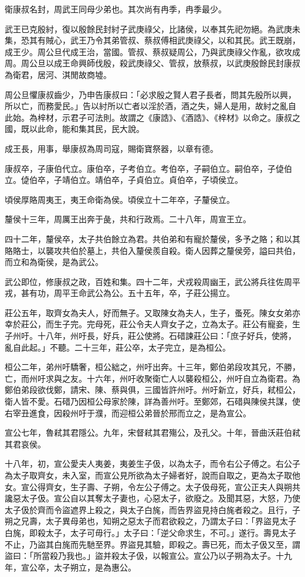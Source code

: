 
\begin{pinyinscope}
衛康叔名封，周武王同母少弟也。其次尚有冉季，冉季最少。

武王已克殷紂，復以殷餘民封紂子武庚祿父，比諸侯，以奉其先祀勿絕。為武庚未集，恐其有賊心，武王乃令其弟管叔、蔡叔傅相武庚祿父，以和其民。武王既崩，成王少。周公旦代成王治，當國。管叔、蔡叔疑周公，乃與武庚祿父作亂，欲攻成周。周公旦以成王命興師伐殷，殺武庚祿父、管叔，放蔡叔，以武庚殷餘民封康叔為衛君，居河、淇閒故商墟。

周公旦懼康叔齒少，乃申告康叔曰：「必求殷之賢人君子長者，問其先殷所以興，所以亡，而務愛民。」告以紂所以亡者以淫於酒，酒之失，婦人是用，故紂之亂自此始。為梓材，示君子可法則。故謂之《康誥》、《酒誥》、《梓材》以命之。康叔之國，既以此命，能和集其民，民大說。

成王長，用事，舉康叔為周司寇，賜衛寶祭器，以章有德。

康叔卒，子康伯代立。康伯卒，子考伯立。考伯卒，子嗣伯立。嗣伯卒，子偼伯立。偼伯卒，子靖伯立。靖伯卒，子貞伯立。貞伯卒，子頃侯立。

頃侯厚賂周夷王，夷王命衛為侯。頃侯立十二年卒，子釐侯立。

釐侯十三年，周厲王出奔于彘，共和行政焉。二十八年，周宣王立。

四十二年，釐侯卒，太子共伯餘立為君。共伯弟和有寵於釐侯，多予之賂；和以其賂賂士，以襲攻共伯於墓上，共伯入釐侯羨自殺。衛人因葬之釐侯旁，謚曰共伯，而立和為衛侯，是為武公。

武公即位，修康叔之政，百姓和集。四十二年，犬戎殺周幽王，武公將兵往佐周平戎，甚有功，周平王命武公為公。五十五年，卒，子莊公揚立。

莊公五年，取齊女為夫人，好而無子。又取陳女為夫人，生子，蚤死。陳女女弟亦幸於莊公，而生子完。完母死，莊公令夫人齊女子之，立為太子。莊公有寵妾，生子州吁。十八年，州吁長，好兵，莊公使將。石碏諫莊公曰：「庶子好兵，使將，亂自此起。」不聽。二十三年，莊公卒，太子完立，是為桓公。

桓公二年，弟州吁驕奢，桓公絀之，州吁出奔。十三年，鄭伯弟段攻其兄，不勝，亡，而州吁求與之友。十六年，州吁收聚衛亡人以襲殺桓公，州吁自立為衛君。為鄭伯弟段欲伐鄭，請宋、陳、蔡與俱，三國皆許州吁。州吁新立，好兵，弒桓公，衛人皆不愛。石碏乃因桓公母家於陳，詳為善州吁。至鄭郊，石碏與陳侯共謀，使右宰丑進食，因殺州吁于濮，而迎桓公弟晉於邢而立之，是為宣公。

宣公七年，魯弒其君隱公。九年，宋督弒其君殤公，及孔父。十年，晉曲沃莊伯弒其君哀侯。

十八年，初，宣公愛夫人夷姜，夷姜生子伋，以為太子，而令右公子傅之。右公子為太子取齊女，未入室，而宣公見所欲為太子婦者好，說而自取之，更為太子取他女。宣公得齊女，生子壽、子朔，令左公子傅之。太子伋母死，宣公正夫人與朔共讒惡太子伋。宣公自以其奪太子妻也，心惡太子，欲廢之。及聞其惡，大怒，乃使太子伋於齊而令盜遮界上殺之，與太子白旄，而告界盜見持白旄者殺之。且行，子朔之兄壽，太子異母弟也，知朔之惡太子而君欲殺之，乃謂太子曰：「界盜見太子白旄，即殺太子，太子可毋行。」太子曰：「逆父命求生，不可。」遂行。壽見太子不止，乃盜其白旄而先馳至界。界盜見其驗，即殺之。壽已死，而太子伋又至，謂盜曰：「所當殺乃我也。」盜并殺太子伋，以報宣公。宣公乃以子朔為太子。十九年，宣公卒，太子朔立，是為惠公。


\end{pinyinscope}
